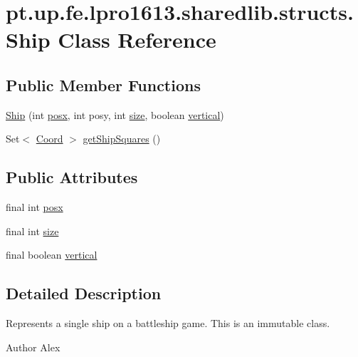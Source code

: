 \hypertarget{classpt_1_1up_1_1fe_1_1lpro1613_1_1sharedlib_1_1structs_1_1_ship}{}\section{pt.\+up.\+fe.\+lpro1613.\+sharedlib.\+structs.\+Ship Class Reference}
\label{classpt_1_1up_1_1fe_1_1lpro1613_1_1sharedlib_1_1structs_1_1_ship}
\subsection*{Public Member Functions}
\begin{DoxyCompactItemize}
\item 
\hyperlink{classpt_1_1up_1_1fe_1_1lpro1613_1_1sharedlib_1_1structs_1_1_ship_ac30ae88e8d24056e23552d183b4dc22c}{Ship} (int \hyperlink{classpt_1_1up_1_1fe_1_1lpro1613_1_1sharedlib_1_1structs_1_1_ship_ad26cd2dc8514c1238146781039fc0865}{posx}, int posy, int \hyperlink{classpt_1_1up_1_1fe_1_1lpro1613_1_1sharedlib_1_1structs_1_1_ship_ae895709b67554ee4cc154cb846f370c6}{size}, boolean \hyperlink{classpt_1_1up_1_1fe_1_1lpro1613_1_1sharedlib_1_1structs_1_1_ship_a11c34815f1fadf10af31516ed990d84c}{vertical})
\item 
Set$<$ \hyperlink{classpt_1_1up_1_1fe_1_1lpro1613_1_1sharedlib_1_1utils_1_1_coord}{Coord} $>$ \hyperlink{classpt_1_1up_1_1fe_1_1lpro1613_1_1sharedlib_1_1structs_1_1_ship_a3c7b155f6810d802c1b3dca5931a9b12}{get\+Ship\+Squares} ()
\end{DoxyCompactItemize}
\subsection*{Public Attributes}
\begin{DoxyCompactItemize}
\item 
final int \hyperlink{classpt_1_1up_1_1fe_1_1lpro1613_1_1sharedlib_1_1structs_1_1_ship_ad26cd2dc8514c1238146781039fc0865}{posx}
\item 
final int \hyperlink{classpt_1_1up_1_1fe_1_1lpro1613_1_1sharedlib_1_1structs_1_1_ship_ae895709b67554ee4cc154cb846f370c6}{size}
\item 
final boolean \hyperlink{classpt_1_1up_1_1fe_1_1lpro1613_1_1sharedlib_1_1structs_1_1_ship_a11c34815f1fadf10af31516ed990d84c}{vertical}
\end{DoxyCompactItemize}


\subsection{Detailed Description}
Represents a single ship on a battleship game. This is an immutable class. \begin{DoxyAuthor}{Author}
Alex 
\end{DoxyAuthor}


